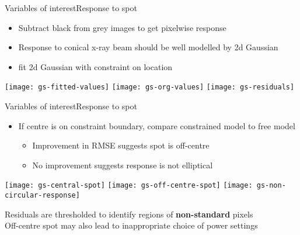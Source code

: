 \documentclass[8pt]{beamer}
\begin{document}
	
\begin{frame}{Variables of interest}{Response to spot}
	\begin{itemize}
		\item Subtract black from grey images to get pixelwise response
		\item Response to conical x-ray beam should be well modelled by 2d Gaussian
		\item fit 2d Gaussian with constraint on location				%
	\end{itemize}
	
	\begin{center}
		\texttt{[image: gs-fitted-values]}
		\texttt{[image: gs-org-values]}			%
		\texttt{[image: gs-residuals]}
	\end{center}
	
\end{frame}		
		
\begin{frame}{Variables of interest}{Response to spot}
	\begin{itemize}
		\item If centre is on constraint boundary, compare constrained model to free model
		\begin{itemize}
			\item Improvement in RMSE suggests spot is off-centre
			\item No improvement suggests response is not elliptical
		\end{itemize}
	\end{itemize}			%
	
	\begin{center}
		\texttt{[image: gs-central-spot]}
		\texttt{[image: gs-off-centre-spot]}			%
		\texttt{[image: gs-non-circular-response]}
	\end{center}
	Residuals are thresholded to identify regions of \textbf{non-standard} pixels\\
	Off-centre spot may also lead to inappropriate choice of power settings
\end{frame}
 
\end{document}
